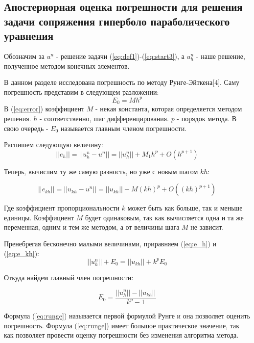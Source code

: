 \subsection{Апостериорная оценка погрешности для решения задачи сопряжения гиперболо параболического уравнения}


Обозначим за $u^n$ - решение задачи (\ref{eq:def1})-(\ref{eq:start3}), а $u_h^n$ - наше решение, полученное методом конечных элементов.

В данном разделе исследована погрешность по методу Рунге-Эйткена[4].
Саму погрешность представим в следующем разложении:
\begin{equation}
    E_0 = Mh^p
    \label{eq:error}
\end{equation}
В (\ref{eq:error}) коэффициент $M$ - некая константа, которая определяется методом решения. $h$ - соответственно, шаг дифференцирования. $p$ - порядок метода.
В свою очередь - $E_0$ называется главным членом погрешности. 

Распишем следующую величину:
\begin{equation}
     ||e_h|| = ||u_h^n - u^n|| = ||u_h^n|| + M_1h^p + O(h^{p+1}) 
    \label{eq:e_h}
\end{equation}

Теперь, вычислим ту же самую разность, но уже с новым шагом $kh$:

\begin{equation}
     ||e_{kh}|| = ||u_{kh} - u^n|| = ||u_{kh}|| + M(kh)^p + O((kh)^{p+1}) 
    \label{eq:e_kh}
\end{equation}

Где коэффициент пропорциональности $k$ может быть как больше, так и меньше единицы. Коэффициент $M$ будет одинаковым, так как вычисляется одна и та же переменная, одним и тем же методом, а от величины шага $M$ не зависит.

Пренебрегая бесконечно малыми величинами, приравняем (\ref{eq:e_h}) и (\ref{eq:e_kh}):
$$
||u_h^n|| + E_0 = ||u_{kh}|| + k^pE_0
$$

Откуда найдем главный член погрешности:

\begin{equation}
    E_0 = \frac{||u_h^n|| - ||u_{kh}||}{k^p - 1}
    \label{eq:runge}
\end{equation}

Формула (\ref{eq:runge}) называется первой формулой Рунге и она позволяет оценить погрешность. Формула (\ref{eq:runge}) имеет большое практическое значение, так как позволяет провести оценку погрешности без изменения алгоритма метода.

